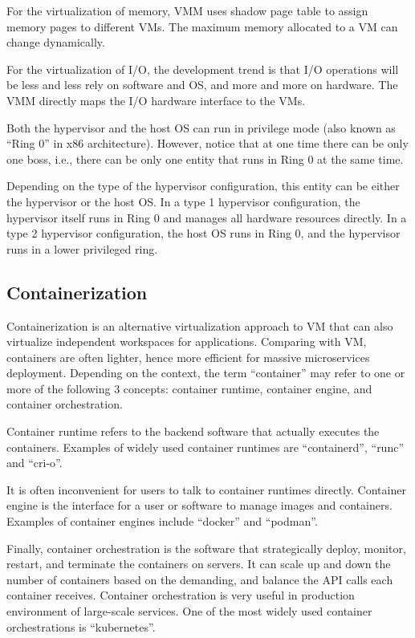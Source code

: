 For the virtualization of memory, VMM uses shadow page table to assign memory pages to different VMs. The maximum memory allocated to a VM can change dynamically.

For the virtualization of I/O, the development trend is that I/O operations will be less and less rely on software and OS, and more and more on hardware. The VMM directly maps the I/O hardware interface to the VMs.

\begin{shortbox}
	Both the hypervisor and the host OS can run in privilege mode (also known as ``Ring 0'' in x86 architecture). However, notice that at one time there can be only one boss, i.e., there can be only one entity that runs in Ring 0 at the same time.
	
	Depending on the type of the hypervisor configuration, this entity can be either the hypervisor or the host OS. In a type 1 hypervisor configuration, the hypervisor itself runs in Ring 0 and manages all hardware resources directly. In a type 2 hypervisor configuration, the host OS runs in Ring 0, and the hypervisor runs in a lower privileged ring.
\end{shortbox}

\subsection{Containerization}

Containerization is an alternative virtualization approach to VM that can also virtualize independent workspaces for applications. Comparing with VM, containers are often lighter, hence more efficient for massive microservices deployment. Depending on the context, the term ``container'' may refer to one or more of the following 3 concepts: container runtime, container engine, and container orchestration.

Container runtime refers to the backend software that actually executes the containers. Examples of widely used container runtimes are ``containerd'', ``runc'' and ``cri-o''. 

It is often inconvenient for users to talk to container runtimes directly. Container engine is the interface for a user or software to manage images and containers. Examples of container engines include ``docker'' and ``podman''. 

Finally, container orchestration is the software that strategically deploy, monitor, restart, and terminate the containers on servers. It can scale up and down the number of containers based on the demanding, and balance the API calls each container receives. Container orchestration is very useful in production environment of large-scale services. One of the most widely used container orchestrations is ``kubernetes''.

